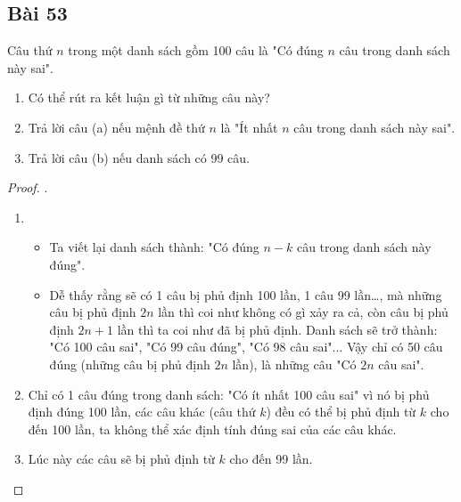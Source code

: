 \subsection*{Bài 53}
Câu thứ $n$ trong một danh sách gồm 100 câu là "Có đúng $n$ câu trong danh sách này sai".
\begin{enumerate}[label=\alph*)]
    \item Có thể rút ra kết luận gì từ những câu này?
    \item Trả lời câu (a) nếu mệnh đề thứ $n$ là "Ít nhất $n$ câu trong danh sách này sai".
    \item Trả lời câu (b) nếu danh sách có 99 câu.
\end{enumerate}
\begin{proof}.
    \begin{enumerate}[label=\alph*)]
        \item \begin{itemize}
            \item Ta viết lại danh sách thành: "Có đúng $n-k$ câu trong danh sách này đúng".
            \item Dễ thấy rằng sẽ có 1 câu bị phủ định 100 lần, 1 câu 99 lần\dots, mà những câu bị phủ định $2n$ lần thì coi như không có gì xảy ra cả, còn câu bị phủ định $2n+1$ lần thì ta coi như đã bị phủ định. Danh sách sẽ trở thành: "Có 100 câu sai", "Có 99 câu đúng", "Có 98 câu sai"... Vậy chỉ có 50 câu đúng (những câu bị phủ định $2n$ lần), là những câu "Có $2n$ câu sai".
        \end{itemize}
        \item Chỉ có 1 câu đúng trong danh sách: "Có ít nhất 100 câu sai" vì nó bị phủ định đúng 100 lần, các câu khác (câu thứ $k$) đều có thể bị phủ định từ $k$ cho đến 100 lần, ta không thể xác định tính đúng sai của các câu khác.
        \item Lúc này các câu sẽ bị phủ định từ $k$ cho đến 99 lần.
    \end{enumerate}
\end{proof}